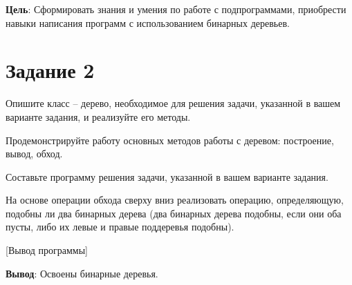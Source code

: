 \documentclass[variant=labwork]{bsuir}
\begin{document}
\maketitle

\textbf{Цель}: Сформировать знания и умения по работе с подпрограммами,
приобрести навыки написания программ с использованием бинарных деревьев.

\section*{Задание 2}

Опишите класс -- дерево, необходимое для решения задачи, указанной в вашем
варианте задания, и реализуйте его методы.

Продемонстрируйте работу основных методов работы с деревом: построение, вывод,
обход.

Составьте программу решения задачи, указанной в вашем варианте задания.

На основе операции обхода сверху вниз реализовать операцию, определяющую,
подобны ли два бинарных дерева (два бинарных дерева подобны, если они оба пусты,
либо их левые и правые поддеревья подобны).


[Вывод программы]

\textbf{Вывод}: Освоены бинарные деревья.
\end{document}

